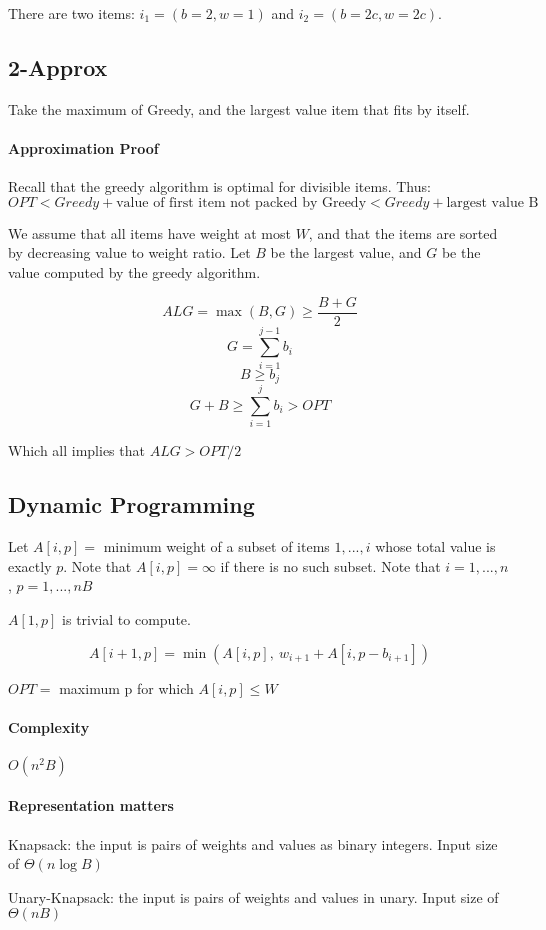 \documentclass[a4paper]{article}
\begin{document}
There are two items: $i_1=(b=2,w=1)$ and $i_2=(b=2c,w=2c)$.


\subsection{2-Approx}
Take the maximum of Greedy, and the largest value item that fits by itself.

\paragraph{Approximation Proof}
Recall that the greedy algorithm is optimal for divisible items. Thus:
$OPT < Greedy + \text{value of first item not packed by Greedy} < Greedy + \text{largest value B}$

We assume that all items have weight at most $W$, and that the items are sorted by decreasing value to weight ratio. Let $B$ be the largest value, and $G$ be the value computed by the greedy algorithm.

\[ALG = \max(B,G) \ge \frac{B+G}{2}\]
\[G = \sum_{i=1}^{j-1} b_i\]
\[B \ge b_j\]
\[G+B \ge \sum_{i=1}^j b_i > OPT\]

Which all implies that $ALG > OPT/2$

\subsection{Dynamic Programming}
Let $A[i,p]=$ minimum weight of a subset of items $1,...,i$ whose total value is exactly $p$. Note that $A[i,p]=\infty$ if there is no such subset. Note that $i=1,...,n$, $p=1,...,nB$

$A[1,p]$ is trivial to compute.

\[A[i+1,p]=\min(A[i,p],\ w_{i+1}+A[i,p-b_{i+1}])\]

$OPT=$ maximum p for which $A[i,p]\le W$

\paragraph{Complexity}
$O(n^2B)$

\paragraph{Representation matters}
Knapsack: the input is pairs of weights and values as binary integers. Input size of $\Theta(n\log B)$

Unary-Knapsack: the input is pairs of weights and values in unary. Input size of $\Theta(nB)$
\end{document}

